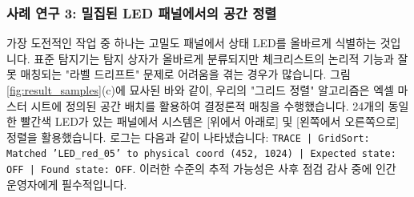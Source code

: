 \subsubsection{사례 연구 3: 밀집된 LED 패널에서의 공간 정렬}
가장 도전적인 작업 중 하나는 고밀도 패널에서 상태 LED를 올바르게 식별하는 것입니다.
표준 탐지기는 탐지 상자가 올바르게 분류되지만 체크리스트의 논리적 기능과 잘못 매칭되는 "라벨 드리프트" 문제로 어려움을 겪는 경우가 많습니다.
그림 \ref{fig:result_samples}(c)에 묘사된 바와 같이, 우리의 "그리드 정렬" 알고리즘은 엑셀 마스터 시트에 정의된 공간 배치를 활용하여 결정론적 매칭을 수행했습니다.
24개의 동일한 빨간색 LED가 있는 패널에서 시스템은 [위에서 아래로] 및 [왼쪽에서 오른쪽으로] 정렬을 활용했습니다.
로그는 다음과 같이 나타냈습니다: \texttt{TRACE | GridSort: Matched 'LED_red_05' to physical coord (452, 1024) | Expected state: OFF | Found state: OFF}.
이러한 수준의 추적 가능성은 사후 점검 감사 중에 인간 운영자에게 필수적입니다.

